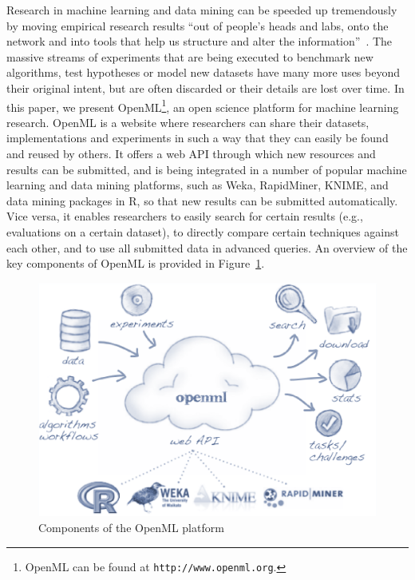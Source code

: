 \documentclass{llncs}
\begin{document}
Research in machine learning and data mining can be speeded up tremendously by moving empirical research results ``out of people's heads and labs, onto the network and into tools that help us structure and alter the information''~\cite{Nielsen2008}. The massive streams of experiments that are being executed to benchmark new algorithms, test hypotheses or model new datasets have many more uses beyond their original intent, but are often discarded or their details are lost over time. In this paper, we present OpenML\footnote{OpenML can be found at \texttt{http://www.openml.org}.}, an open science platform for machine learning research. OpenML is a website where researchers can share their datasets, implementations and experiments in such a way that they can easily be found and reused by others. It offers a web API through which new resources and results can be submitted, and is being integrated in a number of popular machine learning and data mining platforms, such as Weka, RapidMiner, KNIME, and data mining packages in R, so that new results can be submitted automatically. Vice versa, it enables researchers to easily search for certain results (e.g., evaluations on a certain dataset), to directly compare certain techniques against each other, and to use all submitted data in advanced queries. An overview of the key components of OpenML is provided in Figure~\ref{fig:openmlOverview}.

\begin{figure}

 \centering

 \includegraphics[scale=0.35]{openmldiagram.eps}

 \label{fig:openmlOverview}

 \caption{Components of the OpenML platform}

\end{figure}
\end{document}
